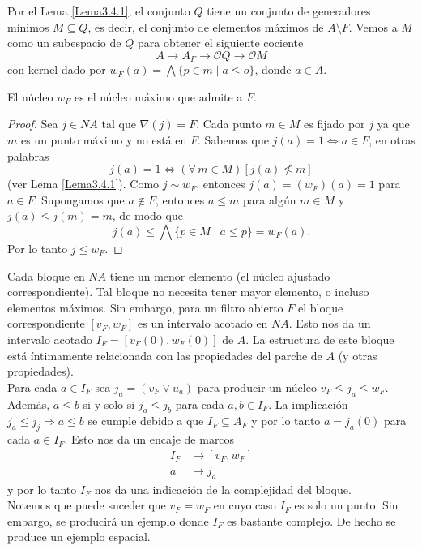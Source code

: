 Por el Lema \ref{Lema3.4.1}, el conjunto $Q$ tiene un conjunto de generadores mínimos $M\subseteq Q$, es decir, el conjunto de elementos máximos de $A\setminus F$. Vemos a $M$ como un subespacio de $Q$ para obtener el siguiente cociente
\[
A\to A_F \to \mathcal{O}Q \to \mathcal{O}M
\]
con kernel dado por $w_F(a)=\bigwedge \{p\in m\mid a\leq o\}$, donde $a\in A$. 

\begin{lem}
    El núcleo $w_F$ es el núcleo máximo que admite a $F$. 
\end{lem}

\begin{proof}
    Sea $j\in NA$ tal que $\nabla (j)=F$. Cada punto $m\in M$ es fijado por $j$ ya que $m$ es un punto máximo y no está en $F$. Sabemos que $j(a)=1\Leftrightarrow a\in F$, en otras palabras 
    \[
    j(a)=1\Leftrightarrow (\forall \, m\in M)[j(a)\nleq m] 
    \]
    (ver Lema \ref{Lema3.4.1}). Como $j\sim w_F$, entonces $j(a)=(w_F)(a)=1$ para $a\in F$. Supongamos que $a\notin F$, entonces $a\leq m$ para algún $m\in M$ y $j(a)\leq j(m)=m$, de modo que 
    \[
    j(a)\leq \bigwedge \{p\in M\mid a\leq p\}=w_F(a).
    \]
    Por lo tanto $j\leq w_F$.
\end{proof}

Cada bloque en $NA$ tiene un menor elemento (el núcleo ajustado correspondiente). Tal bloque no necesita tener mayor elemento, o incluso elementos máximos. Sin embargo, para un filtro abierto $F$ el bloque correspondiente $[v_F, w_F]$ es un intervalo acotado en $NA$. Esto nos da un intervalo acotado $I_F=[v_F(0), w_F(0)]$ de $A$. La estructura de este bloque está íntimamente relacionada con las propiedades del parche de $A$ (y otras propiedades).\\

Para cada $a\in I_F$ sea $j_a=(v_F\vee u_a)$ para producir un núcleo $v_F\leq j_a\leq w_F$. Además, $a\leq b$ si y solo si $j_a\leq j_b$ para cada $a, b\in I_F$. La implicación $j_a\leq j_j\Rightarrow a\leq b$ se cumple debido a que $I_F\subseteq A_F$ y por lo tanto $a=j_a(0)$ para cada $a\in I_F$. Esto nos da un encaje de marcos 
\[
\begin{split}
    I_F &\to [v_F, w_F]\\
    a & \mapsto j_a
\end{split}
\]
y por lo tanto $I_F$ nos da una indicación de la complejidad del bloque.\\

Notemos que puede suceder que $v_F=w_F$ en cuyo caso $I_F$ es solo un punto. Sin embargo, se producirá un ejemplo donde $I_F$ es bastante complejo. De hecho se produce un ejemplo espacial.\\


